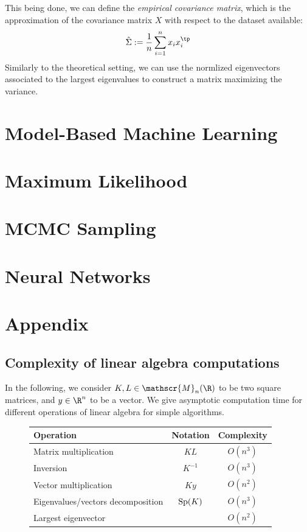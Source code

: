 \documentclass[toc, titlepaged]{../cs-classes/cs-classes}
\begin{document}
This being done, we can define the \emph{empirical covariance matrix}, which is the approximation of the covariance matrix $X$ with respect to the dataset available:
\begin{equation*}
    \hat{\Sigma} := \frac{1}{n} \sum_{i=1}^n  x_ix_i^\tp
\end{equation*}
Similarly to the theoretical setting, we can use the normlized eigenvectors associated to the largest eigenvalues to construct a matrix maximizing the variance.

\section{Model-Based Machine Learning}

\section{Maximum Likelihood}

\section{MCMC Sampling}

\section{Neural Networks}

\section{Appendix}
\subsection{Complexity of linear algebra computations}
In the following, we consider $K, L\in\mathscr{M}_n(\R)$ to be two square matrices, and $y\in\R^n$ to be a vector. We give asymptotic computation time for different operations of linear algebra for simple algorithms.

\begin{figure}[H]
    \centering
    \begin{tabular}{|l|c|c|}
        \hline
        \bf Operation & \bf Notation & \bf Complexity\\
        \hline\hline
        Matrix multiplication & $KL$ & $O(n^3)$\\\hline
        Inversion & $K^{-1}$ & $O(n^3)$\\\hline
        Vector multiplication & $Ky$ & $O(n^2)$\\\hline
        Eigenvalues/vectors decomposition & $\textnormal{Sp}(K)$ & $O(n^3)$\\\hline
        Largest eigenvector & & $O(n^2)$\\\hline
    \end{tabular}
\end{figure}
\end{document}
